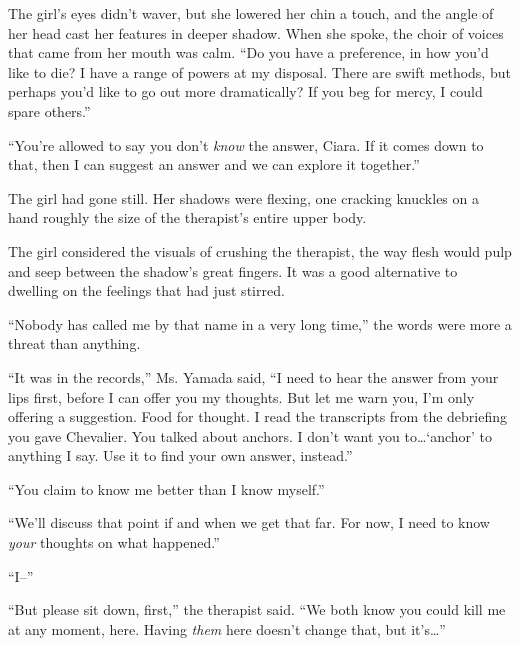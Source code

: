 The girl's eyes didn't waver, but she lowered her chin a touch, and the angle of her head cast her features in deeper shadow.  When she spoke, the choir of voices that came from her mouth was calm.  ``Do you have a preference, in how you'd like to die?  I have a range of powers at my disposal.  There are swift methods, but perhaps you'd like to go out more dramatically?  If you beg for mercy, I could spare others.''



``You're allowed to say you don't\emph{ know }the answer, Ciara.  If it comes down to that, then I can suggest an answer and we can explore it together.''



The girl had gone still.  Her shadows were flexing, one cracking knuckles on a hand roughly the size of the therapist's entire upper body.



The girl considered the visuals of crushing the therapist, the way flesh would pulp and seep between the shadow's great fingers.  It was a good alternative to dwelling on the feelings that had just stirred.



``Nobody has called me by that name in a very long time,'' the words were more a threat than anything.



``It was in the records,''  Ms. Yamada said, ``I need to hear the answer from your lips first, before I can offer you my thoughts.  But let me warn you, I'm only offering a suggestion.  Food for thought.  I read the transcripts from the debriefing you gave Chevalier.  You talked about anchors.  I don't want you to\ldots `anchor' to anything I say.  Use it to find your own answer, instead.''



``You claim to know me better than I know myself.''



``We'll discuss that point if and when we get that far.  For now, I need to know \emph{your} thoughts on what happened.''



``I--''



``But please sit down, first,'' the therapist said.  ``We both know you could kill me at any moment, here.  Having \emph{them} here doesn't change that, but it's\ldots''



